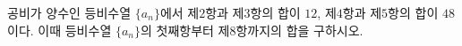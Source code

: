 공비가 양수인 등비수열 $\{a_n\}$에서 제$2$항과 제$3$항의 합이 $12$, 제$4$항과 제$5$항의 합이 $48$이다. 이때 등비수열 $\{a_n\}$의 첫째항부터 제$8$항까지의 합을 구하시오.
